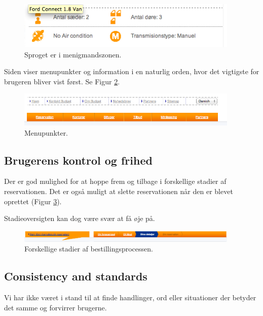 \documentclass[a4paper]{article}
\begin{document}
\begin{figure}[htbp]
  \begin{center}
    \includegraphics[width=400px]{5.png}
  \end{center}
  \caption{Sproget er i menigmandszonen.}
  \label{sprog}
\end{figure}

Siden viser menupunkter og information i en naturlig orden, hvor det vigtigste
for brugeren bliver vist først. Se Figur \ref{menu}.

\begin{figure}[htbp]
  \begin{center}
    \includegraphics[width=400px]{2.png}
  \end{center}
  \caption{Menupunkter.}
  \label{menu}
\end{figure}

\subsection{Brugerens kontrol og frihed}
Der er god mulighed for at hoppe frem og tilbage i forskellige stadier af
reservationen. Det er også muligt at slette reservationen når den er blevet
oprettet (Figur \ref{stadier}).

Stadieoversigten kan dog være svær at få øje på.
\begin{figure}[htbp]
  \begin{center}
    \includegraphics[width=400px]{9.png}
  \end{center}
  \caption{Forskellige stadier af bestillingsprocessen.}
  \label{stadier}
\end{figure}

\subsection{Consistency and standards}
Vi har ikke været i stand til at finde handlinger, ord eller situationer der
betyder det samme og forvirrer brugerne.
\end{document}
